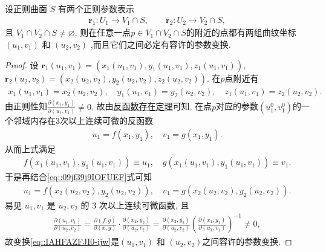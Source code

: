 \documentclass[../../main.tex]{subfiles}%
\begin{document}
\begin{theorem}\label{theorem:正则曲面两组曲纹坐标之间必有容许的参数变换}
设正则曲面 \( S \) 有两个正则参数表示
\begin{align*}
\bm{r}_1 : U_1 \to V_1 \cap S,\qquad \bm{r}_2 : U_2 \to V_2 \cap S,
\end{align*}
且 \( V_1 \cap V_2 \cap S \neq \varnothing \). 则在任意一点$p\in V_1\cap V_2\cap S$的附近的点都有两组曲纹坐标\( (u_1, v_1) \) 和 \( (u_2, v_2) \) ,而且它们之间必定有容许的参数变换.
\end{theorem}
\begin{proof}

设 \( \bm{r}_1(u_1, v_1) = (x_1(u_1, v_1), y_1(u_1, v_1), z_1(u_1, v_1)) \), \( \bm{r}_2(u_2, v_2) = (x_2(u_2, v_2), y_2(u_2, v_2), z_2(u_2, v_2)) \). 在$p$点附近有
\begin{align}\label{eq::09jf39j9IOFUEF}
x_1(u_1, v_1) = x_2(u_2, v_2),\quad y_1(u_1, v_1) = y_2(u_2, v_2),\quad z_1(u_1, v_1) = z_2(u_2, v_2).
\end{align}
由正则性知\( \frac{\partial(x_1, y_1)}{\partial(u_1, v_1)} \neq 0 \), 故由\hyperref[Basis-of-Analytics-theorem:反函数存在定理]{反函数存在定理}可知, 在点$p$对应的参数$(u_1^0,v_1^0)$的一个邻域内存在3次以上连续可微的反函数
\begin{align*}
u_1 = f(x_1, y_1), \quad v_1 = g(x_1, y_1).
\end{align*}
从而上式满足
\begin{align*}
f(x_1(u_1,v_1),y_1(u_1,v_1))\equiv u_1,\quad g(x_1(u_1,v_1),y_1(u_1,v_1))\equiv v_1.
\end{align*}
于是再结合\eqref{eq::09jf39j9IOFUEF}式可知
\begin{align}\label{eq::IAHFAZFJI0-ijw}
u_1 = f(x_2(u_2, v_2), y_2(u_2, v_2)),\quad v_1 = g(x_2(u_2, v_2), y_2(u_2, v_2)).
\end{align}
易见 \( u_1, v_1 \) 是 \( u_2, v_2 \) 的 3 次以上连续可微函数, 且
\begin{align*}
\frac{\partial(u_1, v_1)}{\partial(u_2, v_2)} = \frac{\partial(f, g)}{\partial(x, y)} \cdot \frac{\partial(x_2, y_2)}{\partial(u_2, v_2)} = \frac{\partial(x_2, y_2)}{\partial(u_2, v_2)} \left( \frac{\partial(x_1, y_1)}{\partial(u_1, v_1)} \right)^{-1} \neq 0,
\end{align*}
故变换\eqref{eq::IAHFAZFJI0-ijw}是\( (u_1, v_1) \) 和 \( (u_2, v_2) \)之间容许的参数变换.

\end{proof}
\end{document}
